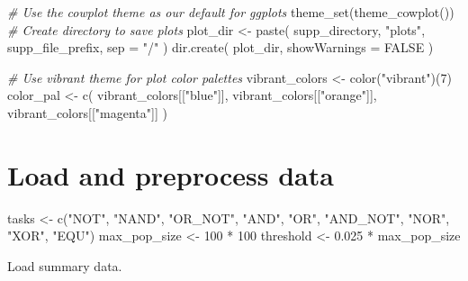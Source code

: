 \documentclass[
]{book}
\newenvironment{Shaded}{\begin{snugshade}}{\end{snugshade}}
\newcommand{\AttributeTok}[1]{\textcolor[rgb]{0.77,0.63,0.00}{#1}}
\newcommand{\CommentTok}[1]{\textcolor[rgb]{0.56,0.35,0.01}{\textit{#1}}}
\newcommand{\ConstantTok}[1]{\textcolor[rgb]{0.00,0.00,0.00}{#1}}
\newcommand{\DecValTok}[1]{\textcolor[rgb]{0.00,0.00,0.81}{#1}}
\newcommand{\FloatTok}[1]{\textcolor[rgb]{0.00,0.00,0.81}{#1}}
\newcommand{\FunctionTok}[1]{\textcolor[rgb]{0.00,0.00,0.00}{#1}}
\newcommand{\NormalTok}[1]{#1}
\newcommand{\OtherTok}[1]{\textcolor[rgb]{0.56,0.35,0.01}{#1}}
\newcommand{\SpecialCharTok}[1]{\textcolor[rgb]{0.00,0.00,0.00}{#1}}
\newcommand{\StringTok}[1]{\textcolor[rgb]{0.31,0.60,0.02}{#1}}
\begin{document}
\begin{Shaded}
\begin{Highlighting}[]
\CommentTok{\# Use the cowplot theme as our default for ggplots}
\FunctionTok{theme\_set}\NormalTok{(}\FunctionTok{theme\_cowplot}\NormalTok{())}
\CommentTok{\# Create directory to save plots}
\NormalTok{plot\_dir }\OtherTok{\textless{}{-}} \FunctionTok{paste}\NormalTok{(}
\NormalTok{  supp\_directory,}
  \StringTok{"plots"}\NormalTok{,}
\NormalTok{  supp\_file\_prefix,}
  \AttributeTok{sep =} \StringTok{"/"}
\NormalTok{)}
\FunctionTok{dir.create}\NormalTok{(}
\NormalTok{  plot\_dir,}
  \AttributeTok{showWarnings =} \ConstantTok{FALSE}
\NormalTok{)}

\CommentTok{\# Use vibrant theme for plot color palettes}
\NormalTok{vibrant\_colors }\OtherTok{\textless{}{-}} \FunctionTok{color}\NormalTok{(}\StringTok{"vibrant"}\NormalTok{)(}\DecValTok{7}\NormalTok{)}
\NormalTok{color\_pal }\OtherTok{\textless{}{-}} \FunctionTok{c}\NormalTok{(}
\NormalTok{  vibrant\_colors[[}\StringTok{"blue"}\NormalTok{]],}
\NormalTok{  vibrant\_colors[[}\StringTok{"orange"}\NormalTok{]],}
\NormalTok{  vibrant\_colors[[}\StringTok{"magenta"}\NormalTok{]]}
\NormalTok{)}
\end{Highlighting}
\end{Shaded}

\hypertarget{load-and-preprocess-data-1}{%
\section{Load and preprocess data}\label{load-and-preprocess-data-1}}

\begin{Shaded}
\begin{Highlighting}[]
\NormalTok{tasks }\OtherTok{\textless{}{-}} \FunctionTok{c}\NormalTok{(}\StringTok{"NOT"}\NormalTok{, }\StringTok{"NAND"}\NormalTok{, }\StringTok{"OR\_NOT"}\NormalTok{, }\StringTok{"AND"}\NormalTok{, }\StringTok{"OR"}\NormalTok{, }\StringTok{"AND\_NOT"}\NormalTok{, }\StringTok{"NOR"}\NormalTok{, }\StringTok{"XOR"}\NormalTok{, }\StringTok{"EQU"}\NormalTok{)}
\NormalTok{max\_pop\_size }\OtherTok{\textless{}{-}} \DecValTok{100} \SpecialCharTok{*} \DecValTok{100}
\NormalTok{threshold }\OtherTok{\textless{}{-}} \FloatTok{0.025} \SpecialCharTok{*}\NormalTok{ max\_pop\_size}
\end{Highlighting}
\end{Shaded}

Load summary data.
\end{document}
